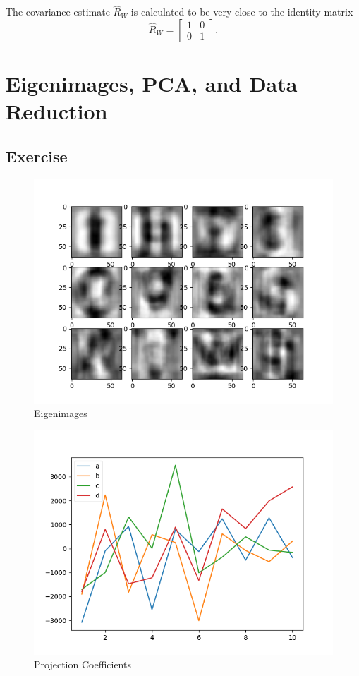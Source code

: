 \documentclass{article}
\begin{document}
The covariance estimate $\hat{R}_W$ is calculated to be very close to the identity matrix
\begin{equation*}
\hat{R}_W = 
\begin{bmatrix}
    1 & 0 \\
    0 & 1
\end{bmatrix}.
\end{equation*}

\section{Eigenimages, PCA, and Data Reduction}
\subsection{Exercise}
\begin{figure}[H]
    \centering
    \includegraphics[width=1\textwidth]{../eigenimages.png}
    \caption{Eigenimages}
\end{figure}
\begin{figure}[H]
    \centering
    \includegraphics[width=1\textwidth]{../projection-coefficients.png}
    \caption{Projection Coefficients}
\end{figure}
\end{document}
